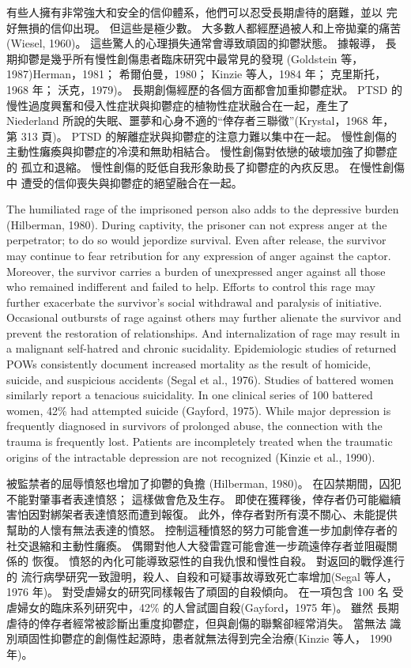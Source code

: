 \documentclass[12pt]{article}
\begin{document}
    有些人擁有非常強大和安全的信仰體系，他們可以忍受長期虐待的磨難，並以
    完好無損的信仰出現。 但這些是極少數。 大多數人都經歷過被人和上帝拋棄的痛苦
    (Wiesel, 1960)。 這些驚人的心理損失通常會導致頑固的抑鬱狀態。 據報導，
    長期抑鬱是幾乎所有慢性創傷患者臨床研究中最常見的發現
    (Goldstein 等，1987)Herman，1981； 希爾伯曼，1980； Kinzie 等人，1984 年；
    克里斯托，1968 年； 沃克，1979)。 長期創傷經歷的各個方面都會加重抑鬱症狀。
    PTSD 的慢性過度興奮和侵入性症狀與抑鬱症的植物性症狀融合在一起，產生了
    Niederland 所說的失眠、噩夢和心身不適的“倖存者三聯徵”(Krystal，1968 年，
    第 313 頁)。 PTSD 的解離症狀與抑鬱症的注意力難以集中在一起。 慢性創傷的
    主動性癱瘓與抑鬱症的冷漠和無助相結合。 慢性創傷對依戀的破壞加強了抑鬱症的
    孤立和退縮。 慢性創傷的貶低自我形象助長了抑鬱症的內疚反思。 在慢性創傷中
    遭受的信仰喪失與抑鬱症的絕望融合在一起。

    The humiliated rage of the imprisoned person also adds to the depressive
    burden (Hilberman, 1980). During captivity, the prisoner can not express
    anger at the perpetrator; to do so would jepordize survival. Even after
    release, the survivor may continue to fear retribution for any expression
    of anger against the captor. Moreover, the survivor carries a burden of
    unexpressed anger against all those who remained indifferent and failed to
    help. Efforts to control this rage may further exacerbate the survivor's
    social withdrawal and paralysis of initiative. Occasional outbursts of rage
    against others may further alienate the survivor and prevent the
    restoration of relationships. And internalization of rage may result in a
    malignant self-hatred and chronic sucidality. Epidemiologic studies of
    returned POWs consistently document increased mortality as the result of
    homicide, suicide, and suspicious accidents (Segal et al., 1976). Studies
    of battered women similarly report a tenacious suicidality. In one clinical
    series of 100 battered women, 42\% had attempted suicide (Gayford, 1975).
    While major depression is frequently diagnosed in survivors of prolonged
    abuse, the connection with the trauma is frequently lost. Patients are
    incompletely treated when the traumatic origins of the intractable
    depression are not recognized (Kinzie et al., 1990).

    被監禁者的屈辱憤怒也增加了抑鬱的負擔 (Hilberman, 1980)。 在囚禁期間，囚犯
    不能對肇事者表達憤怒； 這樣做會危及生存。 即使在獲釋後，倖存者仍可能繼續
    害怕因對綁架者表達憤怒而遭到報復。 此外，倖存者對所有漠不關心、未能提供
    幫助的人懷有無法表達的憤怒。 控制這種憤怒的努力可能會進一步加劇倖存者的
    社交退縮和主動性癱瘓。 偶爾對他人大發雷霆可能會進一步疏遠倖存者並阻礙關係的
    恢復。 憤怒的內化可能導致惡性的自我仇恨和慢性自殺。 對返回的戰俘進行的
    流行病學研究一致證明，殺人、自殺和可疑事故導致死亡率增加(Segal 等人，
    1976 年)。 對受虐婦女的研究同樣報告了頑固的自殺傾向。 在一項包含 100 名
    受虐婦女的臨床系列研究中，42\% 的人曾試圖自殺(Gayford，1975 年)。 雖然
    長期虐待的倖存者經常被診斷出重度抑鬱症，但與創傷的聯繫卻經常消失。 當無法
    識別頑固性抑鬱症的創傷性起源時，患者就無法得到完全治療(Kinzie 等人，
    1990 年)。
\end{document}
